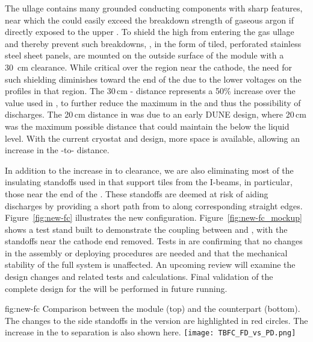 The ullage contains many grounded %
conducting components with sharp features, near which the \efield could easily exceed the breakdown strength of gaseous argon if directly exposed to the upper . %
To shield the high \efield from entering the gas ullage and thereby prevent such breakdowns, %
, %
in the form of tiled, perforated stainless steel sheet panels, are mounted on the outside surface of the 
 module with a \SI{30}{cm} clearance. While critical over the region near the cathode, the need for such shielding diminishes toward the  end of the  due to the lower voltages on the  profiles in that region. 
The 30\,cm - distance represents a 50\% increase over the value used in , to further reduce the maximum \efield in the  and thus the possibility of discharges. The 20\,cm distance in  was due to an early DUNE design, where 20\,cm was the maximum possible distance that could maintain the  below the liquid level. With the current cryostat and  design, more space is available, allowing an increase in the -to- distance. 
 
In addition to the increase in  to  clearance, we are also eliminating most of the insulating standoffs used in  that support  tiles from the  I-beams, in particular, those near the  end of the .  These standoffs  are deemed at risk of aiding discharges by providing a short path from  to  along corresponding straight edges.  Figure~\ref{fig:new-fc} illustrates the new configuration. Figure~\ref{fig:new-fc_mockup} shows a test stand built to demonstrate the coupling between  and , with the standoffs near the cathode end removed. Tests in  are confirming that no changes in the assembly or deploying procedures are needed and that the mechanical stability of the full system is unaffected. An upcoming review will examine the design changes and related tests and calculations. Final validation of the complete  design for the  will be performed in future  running.


\begin{dunefigure}
{fig:new-fc}
{Comparison between the   module (top) and the  counterpart (bottom).  The changes to the  side standoffs in the  version are highlighted in red circles.  The increase in the  to  separation is also shown here.} 
\texttt{[image: TBFC\_FD\_vs\_PD.png]}
\end{dunefigure}

